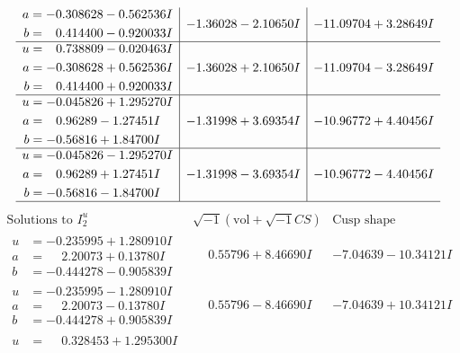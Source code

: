 \documentclass[1p]{elsarticle_modified}
\theoremstyle{definition}
\newcommand{\I}{\sqrt{-1}}
\begin{document}
$$\begin{array}{c|c|c}
\begin{aligned}
a &= -0.308628 - 0.562536 I \\
b &= \phantom{-}0.414400 - 0.920033 I\end{aligned}
 & -1.36028 - 2.10650 I & -11.09704 + 3.28649 I \\ \hline\begin{aligned}
u &= \phantom{-}0.738809 - 0.020463 I \\
a &= -0.308628 + 0.562536 I \\
b &= \phantom{-}0.414400 + 0.920033 I\end{aligned}
 & -1.36028 + 2.10650 I & -11.09704 - 3.28649 I \\ \hline\begin{aligned}
u &= -0.045826 + 1.295270 I \\
a &= \phantom{-}0.96289 - 1.27451 I \\
b &= -0.56816 + 1.84700 I\end{aligned}
 & -1.31998 + 3.69354 I & -10.96772 + 4.40456 I \\ \hline\begin{aligned}
u &= -0.045826 - 1.295270 I \\
a &= \phantom{-}0.96289 + 1.27451 I \\
b &= -0.56816 - 1.84700 I\end{aligned}
 & -1.31998 - 3.69354 I & -10.96772 - 4.40456 I\\
 \hline 
 \end{array}$$\newpage$$\begin{array}{c|c|c}  
\text{Solutions to }I^u_{2}& \I (\text{vol} + \sqrt{-1}CS) & \text{Cusp shape}\\
 \hline 
\begin{aligned}
u &= -0.235995 + 1.280910 I \\
a &= \phantom{-}2.20073 + 0.13780 I \\
b &= -0.444278 - 0.905839 I\end{aligned}
 & \phantom{-}0.55796 + 8.46690 I & -7.04639 - 10.34121 I \\ \hline\begin{aligned}
u &= -0.235995 - 1.280910 I \\
a &= \phantom{-}2.20073 - 0.13780 I \\
b &= -0.444278 + 0.905839 I\end{aligned}
 & \phantom{-}0.55796 - 8.46690 I & -7.04639 + 10.34121 I \\ \hline\begin{aligned}
u &= \phantom{-}0.328453 + 1.295300 I \\

\end{aligned}
\end{array}$$
\end{document}
